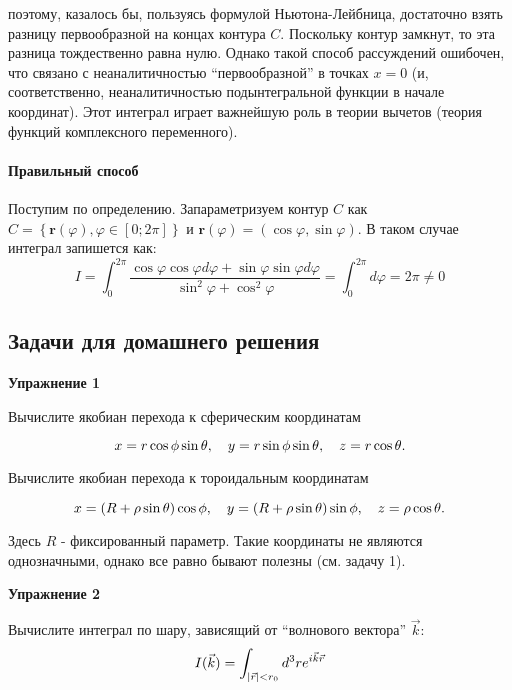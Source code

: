 \documentclass[a4paper,12pt]{article}
\begin{document}
 \noindent
поэтому, казалось бы, пользуясь формулой Ньютона-Лейбница, достаточно
взять разницу первообразной на концах контура $C$. Поскольку контур
замкнут, то эта разница тождественно равна нулю. Однако такой способ
рассуждений ошибочен, что связано с неаналитичностью ``первообразной''
в точках $x=0$ (и, соответственно, неаналитичностью подынтегральной
функции в начале координат). Этот интеграл играет важнейшую роль в
теории вычетов (теория функций комплексного переменного).


\paragraph{Правильный способ}

Поступим по определению. Запараметризуем контур $C$ как $C=\left\{ \mathbf{r}(\varphi),\varphi\in\left[0;2\pi\right]\right\} $
и $\mathbf{r}(\varphi)=(\cos\varphi,\sin\varphi)$. В таком случае
интеграл запишется как:
\[
I=\int_{0}^{2\pi}\frac{\cos\varphi\cos\varphi d\varphi+\sin\varphi\sin\varphi d\varphi}{\sin^{2}\varphi+\cos^{2}\varphi}=\int_{0}^{2\pi}d\varphi=2\pi\neq0
\]

\subsection*{Задачи для домашнего решения}

\noindent \textbf{Упражнение 1}

\noindent Вычислите якобиан перехода к сферическим координатам

\begin{equation}\notag
x=r\cos\phi\sin\theta,\quad y=r\sin\phi\sin\theta,\quad z=r\cos\theta.
\end{equation}

\noindent Вычислите якобиан перехода к тороидальным координатам

\begin{equation}\notag
x=(R+\rho\sin\theta)\cos\phi,\quad y=(R+\rho\sin\theta)\sin\phi,\quad z=\rho\cos\theta.	
\end{equation}

\noindent Здесь $R$ - фиксированный параметр. Такие координаты не являются однозначными, однако все равно бывают полезны (см. задачу 1).

\vspace{15pt}
\noindent \textbf{Упражнение 2}

\noindent Вычислите интеграл по шару, зависящий от “волнового вектора” $\vec{k}$:
\begin{equation}\notag
I(\vec{k})=\int_{|\vec{r}|<r_{0}}d^{3}re^{i\vec{k}\vec{r}}	
\end{equation}
\end{document}
